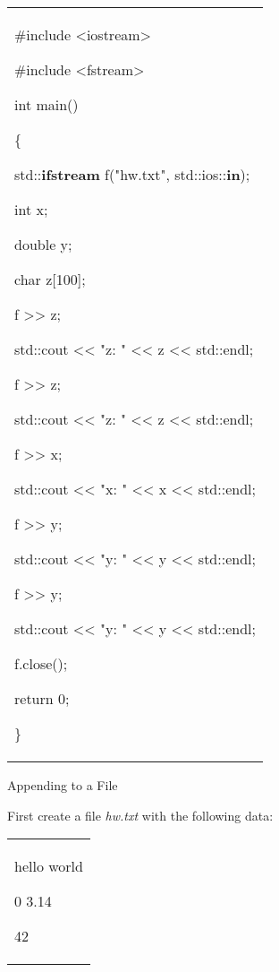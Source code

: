 \documentclass[
]{article}
\begin{document}
\begin{longtable}[]{@{}
  >{\raggedright\arraybackslash}p{}@{}}
\toprule\noalign{}
 \\
\midrule\noalign{}
\endhead
\bottomrule\noalign{}
\endlastfoot
\#include \textless iostream\textgreater{}

\#include \textless fstream\textgreater{}

int main()

\{

std::\textbf{ifstream} f("hw.txt", std::ios::\textbf{in});

int x;

double y;

char z{[}100{]};

f \textgreater\textgreater{} z;

std::cout \textless\textless{} "z: " \textless\textless{} z
\textless\textless{} std::endl;

f \textgreater\textgreater{} z;

std::cout \textless\textless{} "z: " \textless\textless{} z
\textless\textless{} std::endl;

f \textgreater\textgreater{} x;

std::cout \textless\textless{} "x: " \textless\textless{} x
\textless\textless{} std::endl;

f \textgreater\textgreater{} y;

std::cout \textless\textless{} "y: " \textless\textless{} y
\textless\textless{} std::endl;

f \textgreater\textgreater{} y;

std::cout \textless\textless{} "y: " \textless\textless{} y
\textless\textless{} std::endl;

f.close();

return 0;

\} \\
\end{longtable}

Appending to a File

First create a file \emph{hw.txt} with the following data:

\begin{longtable}[]{@{}
  >{\raggedright\arraybackslash}p{}@{}}
\toprule\noalign{}
 \\
\midrule\noalign{}
\endhead
\bottomrule\noalign{}
\endlastfoot
hello world

0 3.14

42 \\
\end{longtable}
\end{document}
